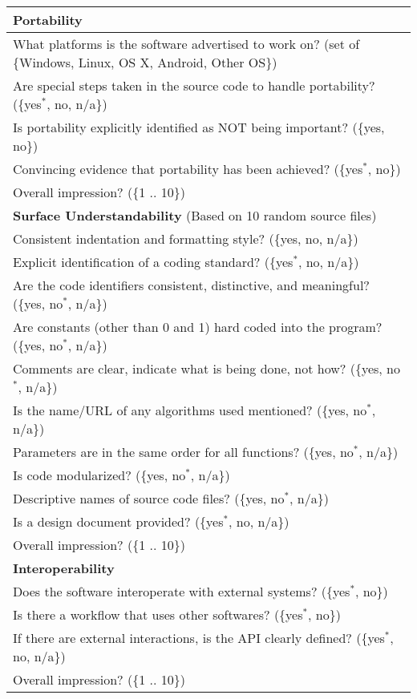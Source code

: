 \begin{longtable}{p{16cm}}
  \midrule
  \textbf{Portability}\\
  \midrule

  What platforms is the software advertised to work on?
  (set of \{Windows, Linux, OS X, Android, Other OS\})\\
  Are special steps taken in the source code to handle portability? (\{yes$^*$,
  no, n/a\}) \\
  Is portability explicitly identified as NOT being important? (\{yes, no\})\\
  Convincing evidence that portability has been achieved? (\{yes$^*$, no\})\\
  Overall impression? (\{1 .. 10\})\\

  \midrule
  \textbf{Surface Understandability} (Based on 10 random source files)\\
  \midrule

  Consistent indentation and formatting style? (\{yes, no, n/a\})\\
  Explicit identification of a coding standard? (\{yes$^*$, no, n/a\})\\
  Are the code identifiers consistent, distinctive, and
  meaningful? (\{yes, no$^*$, n/a\})\\
  Are constants (other than 0 and 1) hard coded into the program? (\{yes, no$^*$, n/a\})\\
  Comments are clear, indicate what is being done, not how? (\{yes, no$^*$, n/a\})\\
  Is the name/URL of any algorithms used mentioned?
  (\{yes, no$^*$, n/a\})\\
  Parameters are in the same order for all functions? (\{yes, no$^*$, n/a\})\\
  Is code modularized? (\{yes, no$^*$, n/a\})\\
  Descriptive names of source code files? (\{yes, no$^*$, n/a\})\\
  Is a design document provided? (\{yes$^*$, no, n/a\})\\
  Overall impression? (\{1 .. 10\})\\

  \midrule
  \textbf{Interoperability}\\
  \midrule

  Does the software interoperate with external systems? (\{yes$^*$, no\})\\
  Is there a workflow that uses other softwares? (\{yes$^*$, no\})\\
  If there are external interactions, is the API clearly defined? (\{yes$^*$, no, n/a\})\\
  Overall impression? (\{1 .. 10\})\\


\end{longtable}
